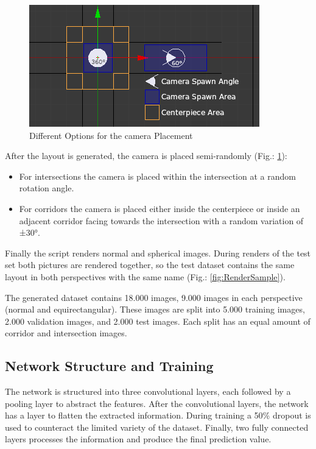 \documentclass[sigconf, nonacm]{acmart}
\begin{document}
\begin{figure}[h]
  \centering
  \includegraphics[width=\linewidth]{Blender_CamSpawnArea}
  \caption{Different Options for the camera Placement}
  \label{fig:Camspawn}
\end{figure}

After the layout is generated, the camera is placed semi-randomly (Fig.: \ref{fig:Camspawn}):
\begin{itemize}
\item For intersections the camera is placed within the intersection at a random rotation angle.
\item For corridors the camera is placed either inside the centerpiece or inside an adjacent corridor facing towards the intersection with a random variation of ±30°.
\end{itemize}

Finally the script renders normal and spherical images.
During renders of the test set both pictures are rendered together, so the test dataset contains the same layout in both perspectives with the same name (Fig.: \ref{fig:RenderSample}).

The generated dataset contains 18.000 images, 9.000 images in each perspective (normal and equirectangular).
These images are split into 5.000 training images, 2.000 validation images, and 2.000 test images.
Each split has an equal amount of corridor and intersection images.

\subsection{Network Structure and Training}
The network is structured into three convolutional layers, each followed by a pooling layer to abstract the features.
After the convolutional layers, the network has a layer to flatten the extracted information.
During training a 50\% dropout is used to counteract the limited variety of the dataset. Finally, two fully connected layers processes the information and produce the final prediction value.
\end{document}
